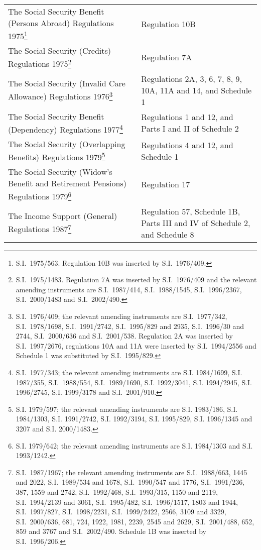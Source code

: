 \documentclass[12pt,a4paper]{article}
\begin{document}
{\noindent{}
\begin{longtable}{p{204.69023pt}p{161.3082pt}}
\hline
\endhead
\hline
\endlastfoot
The Social Security Benefit (Persons Abroad) Regulations 1975\footnote{S.I.\ 1975/563. Regulation 10B was inserted by S.I.\ 1976/409.}	&Regulation 10B\\
The Social Security (Credits) Regulations 1975\footnote{S.I.\ 1975/1483. Regulation 7A was inserted by S.I.\ 1976/409 and the relevant amending instruments are S.I.\ 1987/414, S.I.\ 1988/1545, S.I.\ 1996/2367, S.I.\ 2000/1483 and S.I.\ 2002/490.}	&Regulation 7A\\
The Social Security (Invalid Care Allowance) Regulations 1976\footnote{S.I.\ 1976/409; the relevant amending instruments are S.I.\ 1977/342, S.I.\ 1978/1698, S.I.\ 1991/2742, S.I.\ 1995/829 and 2935, S.I.\ 1996/30 and 2744, S.I.\ 2000/636 and S.I.\ 2001/538. Regulation 2A was inserted by S.I.\ 1997/2676, regulations 10A and 11A were inserted by S.I.\ 1994/2556 and Schedule 1 was substituted by S.I.\ 1995/829.}	&Regulations 2A, 3, 6, 7, 8, 9, 10A, 11A and 14, and Schedule 1\\
The Social Security Benefit (Dependency) Regulations 1977\footnote{\frenchspacing S.I.\ 1977/343; the relevant amending instruments are S.I. 1984/1699, S.I. 1987/355, S.I.\ 1988/554, S.I.\ 1989/1690, S.I. 1992/3041, S.I. 1994/2945, S.I. 1996/2745, S.I. 1999/3178 and S.I.\ 2001/910.}	&Regulations 1 and 12, and Parts I and II of Schedule 2\\
The Social Security (Overlapping Benefits) Regulations 1979\footnote{\frenchspacing S.I. 1979/597; the relevant amending instruments are S.I. 1983/186, S.I. 1984/1303, S.I. 1991/2742, S.I. 1992/3194, S.I. 1995/829, S.I. 1996/1345 and 3207 and S.I. 2000/1483.}	&Regulations 4 and 12, and Schedule 1\\
The Social Security (Widow’s Benefit and Retirement Pensions) Regulations 1979\footnote{\frenchspacing S.I. 1979/642; the relevant amending instruments are S.I. 1984/1303 and S.I. 1993/1242.}	&Regulation 17\\
The Income Support (General) Regulations 1987\footnote{S.I.\ 1987/1967; the relevant amending instruments are S.I.\ 1988/663, 1445 and 2022, S.I.\ 1989/534 and 1678, S.I.\ 1990/547 and 1776, S.I.\ 1991/236, 387, 1559 and 2742, S.I.\ 1992/468, S.I.\ 1993/315, 1150 and 2119, S.I.\ 1994/2139 and 3061, S.I.\ 1995/482, S.I.\ 1996/1517, 1803 and 1944, S.I.\ 1997/827, S.I.\ 1998/2231, S.I.\ 1999/2422, 2566, 3109 and 3329, S.I.\ 2000/636, 681, 724, 1922, 1981, 2239, 2545 and 2629, S.I.\ 2001/488, 652, 859 and 3767 and S.I.\ 2002/490. Schedule 1B was inserted by S.I.\ 1996/206.}	&Regulation 57, Schedule 1B, Parts III and IV of Schedule 2, and Schedule 8\\

\end{longtable}}
\end{document}
